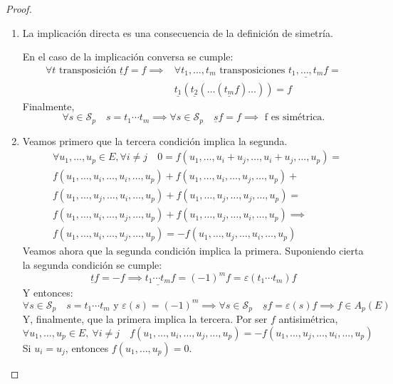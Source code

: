 \begin{proof}~
    \begin{enumerate}
        \item La implicación directa es una consecuencia de la definición de simetría.

        En el caso de la implicación conversa se cumple:
        \[
        \begin{split} \forall t \text{ transposición } \underline{t}f = f \implies & \forall
        t_1,\dots ,t_m \text{ transposiciones } \underline{t_1,\dots,t_m} f =\\
        &\underline{t_1}(\underline{t_2}(\dots (\underline{t_m}f)\dots)) = f
        \end{split}
        \]
        Finalmente,
        \[\forall s \in \mathcal{S}_p \quad s = t_1 \cdots t_m \implies \forall s \in
        \mathcal{S}_p \quad \underline{s}f = f \implies \text{ f es simétrica.}\]

        \item Veamos primero que la tercera condición implica la segunda.
        \[\begin{split}
        &\forall u_1,\dots,u_p \in E, \forall i \neq j \quad
        0 = f(u_1,\dots,u_i+u_j,\dots,u_i+u_j, \dots, u_p) =\\
        &f(u_1,\dots,u_i,\dots,u_i,\dots,u_p)+
        f(u_1,\dots,u_i,\dots,u_j,\dots,u_p)+\\
        &f(u_1,\dots,u_j,\dots,u_i,\dots,u_p)+
        f(u_1,\dots,u_j,\dots,u_j,\dots,u_p)=\\
        &f(u_1,\dots,u_i,\dots,u_j,\dots,u_p)+
        f(u_1,\dots,u_j,\dots,u_i,\dots,u_p)\implies\\
        &f(u_1,\dots,u_i,\dots,u_j,\dots,u_p) =
        -f(u_1,\dots,u_j,\dots,u_i,\dots,u_p)
        \end{split}\]
        Veamos ahora que la segunda condición implica la primera. Suponiendo cierta
        la segunda condición se cumple:
        \[\underline{t}f = -f \implies \underline{t_1\cdots t_m}f = (-1)^mf =
        \varepsilon(t_1\cdots t_m)f\]
        Y entonces:
        \[\forall s \in \mathcal{S}_p \quad s = t_1\cdots t_m \text{ y } \varepsilon(s) = (-1)^m
        \implies \forall s\in \mathcal{S}_p \quad \underline{s}f = \varepsilon(s)f
        \implies f \in A_p(E)\]
        Y, finalmente, que la primera implica la tercera. Por ser $f$ antisimétrica,
        \[
        \forall u_1,\dots,u_p \in E, \ \forall i \neq j \quad
        f(u_1,\dots, u_i, \dots, u_j, \dots, u_p) = -f(u_1,\dots, u_j, \dots, u_i, \dots, u_p)
        \]
        Si $u_i = u_j$, entonces $f(u_1, \dots, u_p) = 0$.

    \end{enumerate}
\end{proof}
